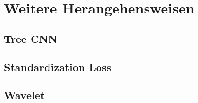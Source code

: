 \section{Weitere Herangehensweisen}


\subsection{Tree CNN}


\subsection{Standardization Loss}


\subsection{Wavelet}
